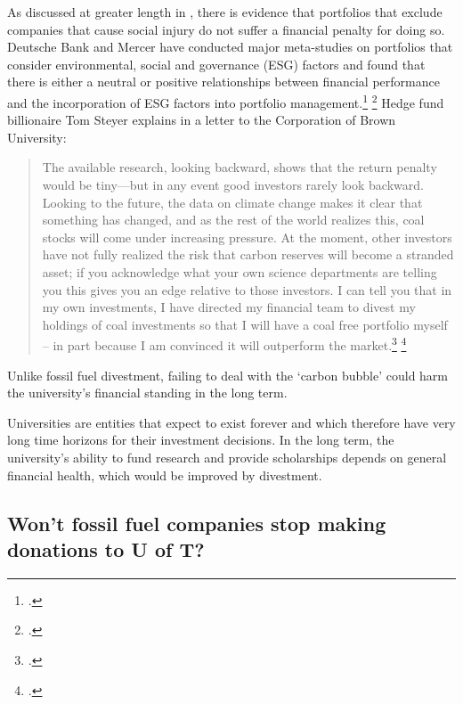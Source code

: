 	
	
As discussed at greater length in , there is evidence that portfolios that exclude companies that cause social injury do not suffer a financial penalty for doing so.
Deutsche Bank and Mercer have conducted major meta-studies on portfolios that consider environmental, social and governance (ESG) factors and found that there is either a neutral or positive relationships between financial performance and the incorporation of ESG factors into portfolio management.\footcite{DeutscheBankSI} \footcite{MercerRI}
Hedge fund billionaire Tom Steyer explains in a letter to the Corporation of Brown University:
\begin{quote}
The available research, looking backward, shows that the return penalty would be tiny—but in any event good investors rarely look backward. Looking to the future, the data on climate change makes it clear that something has changed, and as the rest of the world realizes this, coal stocks will come under increasing pressure. At the moment, other investors have not fully realized the risk that carbon reserves will become a stranded asset; if you acknowledge what your own science departments are telling you this gives you an edge relative to those investors. I can tell you that in my own investments, I have directed my financial team to divest my holdings of coal investments so that I will have a coal free portfolio myself – in part because I am convinced it will outperform the market.\footcite[][]{SteyerBrownLetter} \footcite[See also: ][]{SteyerMiddleburyLetter}
\end{quote}
Unlike fossil fuel divestment, failing to deal with the `carbon bubble' could harm the university's financial standing in the long term.



Universities are entities that expect to exist forever and which therefore have very long time horizons for their investment decisions.
In the long term, the university's ability to fund research and provide scholarships depends on general financial health, which would be improved by divestment.




	\subsection{Won't fossil fuel companies stop making donations to U of T?}
	\label{NoMoreDonations}



